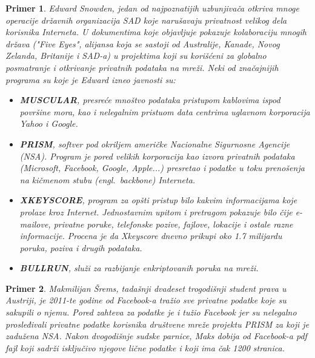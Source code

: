 \documentclass[a4paper]{article}
\newtheorem{primer}{Primer}[section]
\begin{document}
\begin{primer}
	Edward Snowden, jedan od najpoznatijih uzbunjivača otkriva mnoge operacije državnih organizacija SAD koje narušavaju privatnost velikog dela korisnika Interneta. U dokumentima koje objavljuje pokazuje kolaboraciju mnogih država ("Five Eyes", alijansa koja se sastoji od Australije, Kanade, Novog Zelanda, Britanije i SAD-a) u projektima koji su korišćeni za globalno posmatranje i otkrivanje privatnih podataka na mreži.\cite{noPlaceToHide} Neki od značajnijih programa su koje je Edward izneo javnosti su:
\begin{itemize}
	\item \textbf{MUSCULAR}, presreće mnoštvo podataka pristupom kablovima ispod površine mora, kao i nelegalnim pristuom data centrima uglavnom korporacija Yahoo i Google. \cite{noPlaceToHide}
	\item \textbf{PRISM}, softver pod okriljem američke Nacionalne Sigurnosne Agencije (NSA). Program je pored velikih korporacija kao izvora privatnih podataka (Microsoft, Facebook, Google, Apple...) presretao i podatke u toku prenošenja na kičmenom stubu (engl.~{\em backbone}) Interneta. \cite{noPlaceToHide}
	\item \textbf{XKEYSCORE}, program za opšti pristup bilo kakvim informacijama koje prolaze kroz Internet. Jednostavnim upitom i pretragom pokazuje bilo čije e-mailove, privatne poruke, telefonske pozive, fajlove, lokacije i ostale razne informacije. Procena je da Xkeyscore dnevno prikupi oko 1.7 milijardu poruka, poziva i drugih podataka. \cite{noPlaceToHide}
	\item \textbf{BULLRUN}, služi za razbijanje enkriptovanih poruka na mreži. \cite{noPlaceToHide}
\end{itemize}
\end{primer}

\begin{primer}
	Makmilijan Šrems, tadašnji dvadeset trogodišnji student prava u
Austriji, je 2011-te godine od Facebook-a tražio sve privatne podatke koje su sakupili o njemu. Pored zahteva za podatke je i tužio Facebook jer su nelegalno prosleđivali privatne podatke korisnika društvene mreže projektu PRISM\cite{noPlaceToHide} za koji je zadužena NSA. Nakon dvogodišnje sudske parnice, Maks dobija od Facebook-a pdf fajl koji sadrži isključivo njegove lične podatke i koji ima čak 1200 stranica. \cite{marxSchremsFT}
\end{primer}
\end{document}
